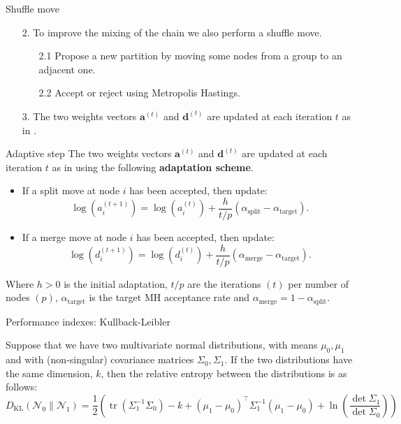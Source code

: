 \begin{frame}{Shuffle move}
    \begin{enumerate}
        \item[2.] To improve the mixing of the chain we also perform a \alert{shuffle move}.
            \begin{enumerate}
                \item[2.1] Propose a new partition by moving some nodes from a group to an adjacent one.
                \item[2.2] Accept or reject using Metropolis Hastings.
            \end{enumerate}

        \vspace*{0.5cm}
        \item[3.] The two weights vectors $\bm{a}^{(t)}$ and $\bm{d}^{(t)}$ are updated at each iteration $t$ as in \cite{bensonAdaptiveMCMCMultiple2018}.
    \end{enumerate}

\end{frame}



\begin{frame}{Adaptive step}
    The two weights vectors $\bm{a}^{(t)}$ and $\bm{d}^{(t)}$ are updated at each iteration $t$ as in \cite{bensonAdaptiveMCMCMultiple2018} using the following \textbf{adaptation scheme}.
    \pause
    
    \begin{itemize}
        \item If a \alert{split} move at node $i$ has been accepted, then update:
        \[
            \log (a_i^{(t+1)})=\log (a_i^{(t)})+\frac{h}{t/p}(\alpha_{\text{split}}-\alpha_{\text{target}}) .
        \]
        \item If a \alert{merge} move at node $i$ has been accepted, then update:
        \[
            \log (d_i^{(t+1)})=\log (d_i^{(t)})+\frac{h}{t/p}(\alpha_{\text{merge}}-\alpha_{\text{target}}) .
        \]
    \end{itemize}
Where $h>0$ is the initial adaptation, $t/p$ are the iterations $(t)$ per number of nodes $(p)$, $\alpha_{\text{target}}$ is the target MH acceptance rate and $\alpha_{\text{merge}} = 1 - \alpha_{\text{split}}$.
\end{frame}



\begin{frame}{Performance indexes: Kullback-Leibler}
    
    Suppose that we have two multivariate normal distributions, with means $\mu_0, \mu_1$ and with (non-singular) covariance matrices $\Sigma_0, \Sigma_1$. If the two distributions have the same dimension, $k$, then the relative entropy between the distributions is as follows:
    \[
        D_{\mathrm{KL}}\left(\mathcal{N}_0 \| \mathcal{N}_1\right)=\frac{1}{2}\left(\operatorname{tr}\left(\Sigma_1^{-1} \Sigma_0\right)-k+\left(\mu_1-\mu_0\right)^{\top} \Sigma_1^{-1}\left(\mu_1-\mu_0\right)+\ln \left(\frac{\operatorname{det} \Sigma_1}{\operatorname{det} \Sigma_0}\right)\right)
    \]
\end{frame}



